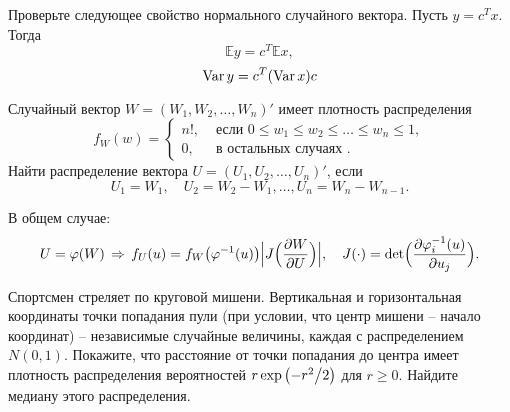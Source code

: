 \begin{ordre}
Проверьте следующее свойство нормального случайного вектора.
Пусть $y=c^Tx$. Тогда 
$$
{\mathbb E}y=c^T{\mathbb E}x, 
$$
$$
\mathop{\mathrm{Var}}\nolimits y=c^T (\mathop{\mathrm{Var}}\nolimits x) c 
$$
\end{ordre}



\begin{problem}
Случайный вектор $W=(W_1, W_2, \ldots, W_n)'$ имеет плотность распределения 
$$
f_W(w)=\begin{cases}
n! , & \text{ если } 0\leqslant w_1\leqslant w_2\leqslant \ldots \leqslant w_n\leqslant 1, \\
0, & \text{ в остальных случаях }. 
\end{cases}
$$
Найти распределение вектора $U=(U_1, U_2, \ldots, U_n)'$, если 
$$
U_1=W_1, \quad U_2=W_2-W_1, \ldots, U_n=W_n-W_{n-1} . 
$$
\end{problem}

\begin{ordre}
В общем случае: 
$$
U=\varphi(W) \,\Rightarrow\, f_U(u)=f_W\bigl(\varphi^{-1}(u)\bigr) \Bigl| J\Bigl( \frac{\partial W}{\partial U}\Bigr)\Bigr|, \quad 
J(\cdot)=\det\Bigl( \frac{\partial \varphi_i^{-1}(u)}{\partial u_j}\Bigr) . 
$$
\end{ordre}


\begin{problem}
Спортсмен стреляет по круговой мишени. Вертикальная и горизонтальная 
координаты точки попадания пули (при условии, что центр мишени -- начало 
координат) -- независимые случайные величины, каждая с распределением 
$N(0,1)$. Покажите, что расстояние от точки попадания до центра имеет 
плотность распределения вероятностей $r\exp \left( {-{r^2} \mathord{\left/ 
{\vphantom {{r^2} 2}} \right. \kern-\nulldelimiterspace} 2} \right)$ для 
$r\ge 0$. Найдите медиану этого распределения.
\end{problem}